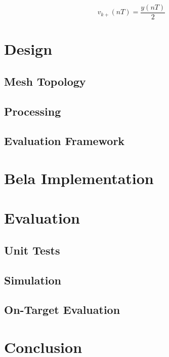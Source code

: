 \documentclass{article}
\begin{document}
\begin{equation}
    v_{k+}(nT) = \frac{y(nT)}{2}
\end{equation}\label{eq:inject}

\section{Design}

\subsection{Mesh Topology}



\subsection{Processing}

% 

\subsection{Evaluation Framework}

\section{Bela Implementation}

\section{Evaluation}

\subsection{Unit Tests}

\subsection{Simulation}

\subsection{On-Target Evaluation}

\section{Conclusion}
\end{document}
